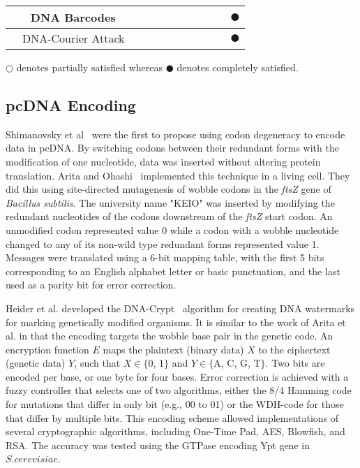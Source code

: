 \documentclass{bioinfo}
\begin{document}
\begin{table*}[t]
{\begin{tabular}{|c|c|c|c|c|c|c|c|c|c|c|}
		&DNA Barcodes~\cite{KS2015BMCB}  &\centering{$\CIRCLE$}  &  &\centering{$\CIRCLE$}  &  &\centering{$\CIRCLE$}  &\centering{$\CIRCLE$}  &  &  &$\CIRCLE$\\ \hline
		&DNA-Courier Attack~\cite{CLY2015SAPW}  &  &  &\centering{$\CIRCLE$}  &\centering{$\CIRCLE$}  &  &  &  &\centering{$\CIRCLE$}  &$\CIRCLE$\\ \hline
	\end{tabular}}
    \fontsize{7pt}{12pt}\selectfont
    \raggedright $\Circle$ denotes partially satisfied whereas $\CIRCLE$ denotes completely satisfied.
\end{table*}

\subsection{pcDNA Encoding}

Shimanovsky et al~\cite{SFHC2003BL} were the first to propose using codon degeneracy to encode data in pcDNA. By switching codons between their redundant forms with the modification of one nucleotide, data was inserted without altering protein translation. Arita and Ohashi~\cite{AY2004BP} implemented this technique in a living cell. They did this using site-directed mutagenesis of wobble codons in the \textit{ftsZ} gene of \textit{Bacillus subtilis}. The university name "KEIO" was inserted by modifying the redundant nucleotides of the codons downstream of the \textit{ftsZ} start codon. An unmodified codon represented value 0 while a codon with a wobble nucleotide changed to any of its non-wild type redundant forms represented value 1. Messages were translated using a 6-bit mapping table, with the first 5 bits corresponding to an English alphabet letter or basic punctuation, and the last used as a parity bit for error correction.

Heider et al. developed the DNA-Crypt~\cite{HBBMC2007} algorithm for creating DNA watermarks for marking genetically modified organisms. It is similar to the work of Arita et al. in that the encoding targets the wobble base pair in the genetic code. An encryption function $E$ maps the plaintext (binary data) $X$ to the ciphertext (genetic data) $Y$, such that $X \in  \{$0, 1$\}$ and $Y \in \{$A, C, G, T$\}$. Two bits are encoded per base, or one byte for four bases. Error correction is achieved with a fuzzy controller that selects one of two algorithms, either the 8/4 Hamming code for mutations that differ in only bit (e.g., 00 to 01) or the WDH-code for those that differ by multiple bits. This encoding scheme allowed implementations of several cryptographic algorithms, including One-Time Pad, AES, Blowfish, and RSA. The accuracy was tested using the GTPase encoding Ypt gene in $S. cerevisiae$.
\end{document}

